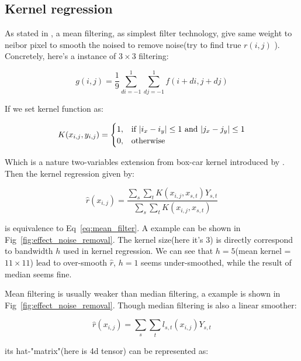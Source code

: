 \documentclass{article}
\begin{document}
\subsection{Kernel regression}

As stated in \cite{solomon2011fundamentals}, a mean filtering, as simplest filter technology, give same weight to neibor pixel to smooth the
noised to remove noise(try to find true $r(i,j)$ ). Concretely, here's a instance of $3 \times 3$ filtering:

\begin{equation}
g(i,j) = \frac{1}{9} \sum_{di=-1}^1 \sum_{dj=-1}^1 f(i+di,j+dj)
\label{eq:mean_filter}
\end{equation}

If we set kernel function as:

$$ 
K(x_{i,j},y_{i,j}) =  
\begin{cases}
  1, & \text{if $ |i_x - i_y| \le 1$ and $|j_x - j_y| \le 1$} \\
  0, & \text{otherwise}
\end{cases}
$$

Which is a nature two-variables extension from box-car kernel introduced by \cite{wasserman2006all}.
Then the kernel regression given by:

$$
\hat{r}(x_{i,j}) = \frac{\sum_{s} \sum_{t} K(x_{i,j},x_{s,t}) Y_{s,t}}{\sum_{s} \sum_{t} K(x_{i,j},x_{s,t})}
$$

is equivalence to Eq~\ref{eq:mean_filter}. A example can be shown in Fig~\ref{fig:effect_noise_removal}. 
The kernel size(here it's $3$) is directly correspond to bandwidth $h$ used in kernel regression. 
We can see that $h=5$(mean kernel = $11 \times 11 $) lead to over-smooth $\hat{r}$, $h=1$ seems under-smoothed,
while the result of median seems fine.

Mean filtering is usually weaker than median filtering, a example is shown in Fig~\ref{fig:effect_noise_removal}. 
Though median filtering is also a linear smoother: 

$$
\hat{r}(x_{i,j})=\sum_s \sum_t l_{s,t}(x_{i,j})Y_{s,t}$$

its hat-"matrix"(here is 4d tensor) can be represented as: 
\end{document}
